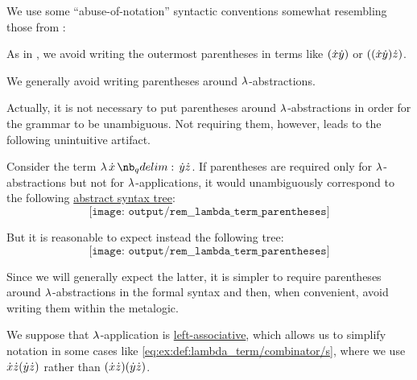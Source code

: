 \begin{remark}\label{rem:lambda_term_parentheses}
  We use some \enquote{abuse-of-notation} syntactic conventions somewhat resembling those from :
  \begin{thmenum}
     As in , we avoid writing the outermost parentheses in terms like \( ({\dot{x}} {\dot{y}}) \) or \( (({\dot{x}} {\dot{y}}) {\dot{z}}) \).

     We generally avoid writing parentheses around \( \mathrm{\lambda} \)-abstractions.

    Actually, it is not necessary to put parentheses around \( \mathrm{\lambda} \)-abstractions in order for the grammar to be unambiguous. Not requiring them, however, leads to the following unintuitive artifact.

    Consider the term \( \qabs \synx \syny \synz \). If parentheses are required only for \( \mathrm{\lambda} \)-abstractions but not for \( \mathrm{\lambda} \)-applications, it would unambiguously correspond to the following \hyperref[def:lambda_term_ast]{abstract syntax tree}:
    \begin{equation*}
      \texttt{[image: output/rem\_\_lambda\_term\_parentheses]}
    \end{equation*}

    But it is reasonable to expect instead the following tree:
    \begin{equation*}
      \texttt{[image: output/rem\_\_lambda\_term\_parentheses]}
    \end{equation*}

    Since we will generally expect the latter, it is simpler to require parentheses around \( \mathrm{\lambda} \)-abstractions in the formal syntax and then, when convenient, avoid writing them within the metalogic.

     We suppose that \( \mathrm{\lambda} \)-application is \hyperref[rem:binary_operation_syntax_trees/associativity]{left-associative}, which allows us to simplify notation in some cases like \eqref{eq:ex:def:lambda_term/combinator/s}, where we use \( {\dot{x}} {\dot{z}} ({\dot{y}} {\dot{z}}) \) rather than \( ({\dot{x}} {\dot{z}})({\dot{y}} {\dot{z}}) \).
  \end{thmenum}
\end{remark}

